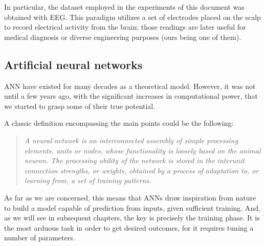 		In particular, the dataset employed in the experiments of this document was obtained with \acs{EEG}. This paradigm utilizes a set of electrodes placed on the scalp to record electrical activity from the brain; those readings are later useful for medical diagnosis or diverse engineering purposes (ours being one of them).

	\subsection{Artificial neural networks}

		\ac{ANN} have existed for many decades as a theoretical model. However, it was not until a few years ago, with the significant increases in computational power, that we started to grasp some of their true potential.

		A classic definition encompassing the main points could be the following: 

		\begin{quotation}
			\textit{A neural network is an interconnected assembly of simple processing elements, units or nodes, whose functionality is loosely based on the animal neuron. The processing ability of the network is stored in the interunit connection strengths, or weights, obtained by a process of adaptation to, or learning from, a set of training patterns.\cite{nnintro}}
		\end{quotation}

		As far as we are concerned, this means that \acs{ANN}s draw inspiration from nature to build a model capable of prediction from inputs, given sufficient training. And, as we will see in subsequent chapters, the key is precisely the training phase. It is the most arduous task in order to get desired outcomes, for it requires tuning a number of parameters.



